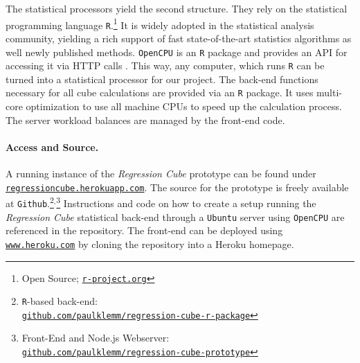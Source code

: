 \documentclass[journal]{style/vgtc} 			          %
\newcommand{\com}[1]{\textcolor{orange}{\uline{#1}}}
\begin{document}
The statistical processors yield the second structure.
They rely on the statistical programming language \texttt{R}.\footnote{Open Source; \href{http://r-project.org}{\texttt{r-project.org}}}
It is widely adopted in the statistical analysis community, yielding a rich support of fast state-of-the-art statistics algorithms as well newly published methods.
\texttt{OpenCPU} is an \texttt{R} package and provides an API for accessing it via HTTP calls \cite{Ooms}.
This way, any computer, which runs \texttt{R} can be turned into a statistical processor for our project.
The back-end functions necessary for all cube calculations are provided via an \texttt{R} package.
It uses multi-core optimization to use all machine CPUs to speed up the calculation process.
The server workload balances are managed by the front-end code.

\paragraph{Access and Source.}
A running instance of the \emph{Regression Cube} prototype can be found under \href{http://regressioncube.herokuapp.com/}{\texttt{regressioncube.herokuapp.com}}.
The source for the prototype is freely available at \texttt{Github}.\footnote{\texttt{R}-based back-end: \href{https://github.com/paulklemm/regression-cube-r-package}{\\\texttt{github.com/paulklemm/regression-cube-r-package}}}$^{,}$\footnote{Front-End and Node.js Webserver: \href{https://github.com/paulklemm/regression-cube-prototype}{\texttt{\\github.com/paulklemm/regression-cube-prototype}}}
Instructions and code on how to create a setup running the \emph{Regression Cube} statistical back-end through a \texttt{Ubuntu} server using \texttt{OpenCPU} are referenced in the repository.
The front-end can be deployed using \href{https://www.heroku.com/}{\texttt{www.heroku.com}} by cloning the repository into a Heroku homepage. 
\end{document}
